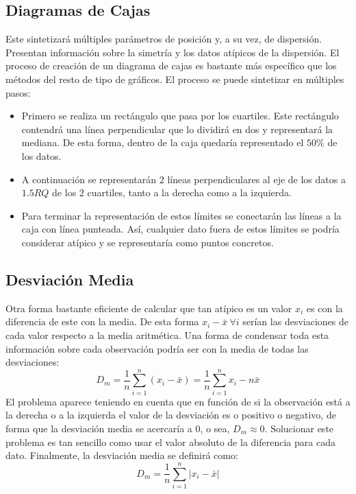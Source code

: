 \documentclass[10pt,a4paper]{book}
\begin{document}
\subsection{Diagramas de Cajas}
Este sintetizará múltiples parámetros de posición y, a su vez, de dispersión. Presentan información sobre la simetría y los datos atípicos de la dispersión. El proceso de creación de un diagrama de cajas es bastante más específico que los métodos del resto de tipo de gráficos. El proceso se puede sintetizar en múltiples pasos: 
\begin{itemize}
	\item Primero se realiza un rectángulo que pasa por los cuartiles. Este rectángulo contendrá una línea perpendicular que lo dividirá en dos y representará la mediana. De esta forma, dentro de la caja quedaría representado el $50\%$ de los datos.
	\item A continuación se representarán $2$ líneas perpendiculares al eje de los datos a $1.5RQ$ de los 2 cuartiles, tanto a la derecha como a la izquierda.
	\item Para terminar la representación de estos límites se conectarán las líneas a la caja con línea punteada. Así, cualquier dato fuera de estos límites se podría considerar atípico y se representaría como puntos concretos.
\end{itemize}
\subsection{Desviación Media}
Otra forma bastante eficiente de calcular que tan atípico es un valor $x_i$ es con la diferencia de este con la media. De esta forma $x_i-\bar x\:\forall i$ serían las desviaciones de cada valor respecto a la media aritmética. Una forma de condensar toda esta información sobre cada observación podría ser con la media de todas las desviaciones:
\[D_m = \frac{1}{n}\sum_{i=1}^n(x_i-\bar x) = \frac{1}{n}\sum_{i=1}^nx_i-n\bar x\]
El problema aparece teniendo en cuenta que en función de si la observación está a la derecha o a la izquierda el valor de la desviación es o positivo o negativo, de forma que la desviación media se acercaría a $0$, o sea, $D_m\approx0$. Solucionar este problema es tan sencillo como usar el valor absoluto de la diferencia para cada dato. Finalmente, la desviación media se definirá como: 
\[D_m = \frac1{n}\sum_{i=1}^n|x_i-\bar x|\]
\end{document}
